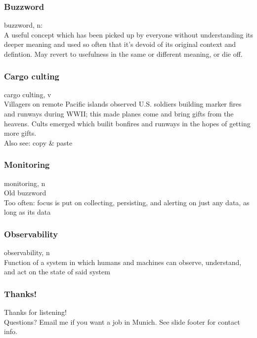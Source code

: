 \documentclass[t]{beamer}
\begin{document}
\begin{frame}
	\frametitle{Buzzword}
	\begin{center}
		\vfill
		buzzword, n:\\
		A useful concept which has been picked up by everyone without understanding its deeper meaning and used so often that it's devoid of its original context and defintion.
		May revert to usefulness in the same or different meaning, or die off.
		\vfill
	\end{center}
\end{frame}

\begin{frame}
	\frametitle{Cargo culting}
	\begin{center}
		\vfill
		cargo culting, v\\
		Villagers on remote Pacific islands observed U.S. soldiers building marker fires and runways during WWII; this made planes come and bring gifts from the heavens.
		Cults emerged which builit bonfires and runways in the hopes of getting more gifts.\\
		Also see: copy \& paste
		\vfill
	\end{center}
\end{frame}

\begin{frame}
	\frametitle{Monitoring}
	\begin{center}
		\vfill
		monitoring, n\\
		Old buzzword\\
		Too often: focus is put on collecting, persisting, and alerting on just any data, as long as its data
		\vfill
	\end{center}
\end{frame}

\begin{frame}
	\frametitle{Observability}
	\begin{center}
		\vfill
		observability, n\\
		Function of a system in which humans and machines can observe, understand, and act on the state of said system
		\vfill
	\end{center}
\end{frame}

\begin{frame}
	\frametitle{Thanks!}
	\begin{center}
		\vfill
		Thanks for listening!\\
		\vfill
		Questions?
		\vfill
		Email me if you want a job in Munich.
		\vfill
		See slide footer for contact info.
		\vfill
	\end{center}
\end{frame}
\end{document}
